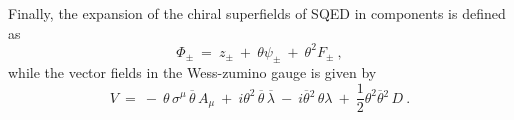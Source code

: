 \documentclass[12pt]{revtex4}
\begin{document}
Finally, the expansion of the chiral superfields of SQED in components is
defined as
\[
        \Phi_\pm ~=~ z_\pm ~+~ \theta\psi_\pm ~+~ \theta^2 F_\pm~, 
\]
while the vector fields in the Wess-zumino gauge is given by
\[
        V ~=~  -~ \theta\,\sigma^\mu\, \overline{\theta}\, A_\mu ~+~
                i \theta^2\, \overline{\theta}\, \overline{\lambda} 
                ~-~
                i \overline{\theta}{}^2\, \theta\lambda
                ~+~
                \frac{1}{2}
                \theta^2\overline{\theta}{}^2\, D~.
\]





\end{document}
